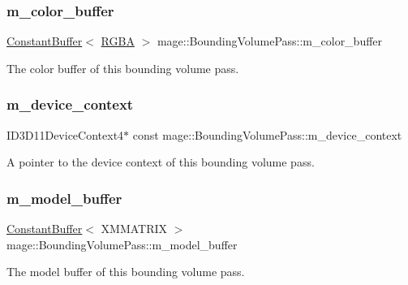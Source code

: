 \subsubsection{\texorpdfstring{m\+\_\+color\+\_\+buffer}{m\_color\_buffer}}
{\footnotesize\ttfamily \hyperlink{classmage_1_1_constant_buffer}{Constant\+Buffer}$<$ \hyperlink{structmage_1_1_r_g_b_a}{R\+G\+BA} $>$ mage\+::\+Bounding\+Volume\+Pass\+::m\+\_\+color\+\_\+buffer\hspace{0.3cm}{\ttfamily [private]}}

The color buffer of this bounding volume pass. \hypertarget{classmage_1_1_bounding_volume_pass_a4ee95284ca70becba75d4be1a19268d7}{}\label{classmage_1_1_bounding_volume_pass_a4ee95284ca70becba75d4be1a19268d7} 
\subsubsection{\texorpdfstring{m\+\_\+device\+\_\+context}{m\_device\_context}}
{\footnotesize\ttfamily I\+D3\+D11\+Device\+Context4$\ast$ const mage\+::\+Bounding\+Volume\+Pass\+::m\+\_\+device\+\_\+context\hspace{0.3cm}{\ttfamily [private]}}

A pointer to the device context of this bounding volume pass. \hypertarget{classmage_1_1_bounding_volume_pass_a07df0f32726f390dd0f060bc6d61b40e}{}\label{classmage_1_1_bounding_volume_pass_a07df0f32726f390dd0f060bc6d61b40e} 
\subsubsection{\texorpdfstring{m\+\_\+model\+\_\+buffer}{m\_model\_buffer}}
{\footnotesize\ttfamily \hyperlink{classmage_1_1_constant_buffer}{Constant\+Buffer}$<$ X\+M\+M\+A\+T\+R\+IX $>$ mage\+::\+Bounding\+Volume\+Pass\+::m\+\_\+model\+\_\+buffer\hspace{0.3cm}{\ttfamily [private]}}

The model buffer of this bounding volume pass. \hypertarget{classmage_1_1_bounding_volume_pass_a32ceb2fa35f36e66fe779eb738df8cfe}{}\label{classmage_1_1_bounding_volume_pass_a32ceb2fa35f36e66fe779eb738df8cfe} 
